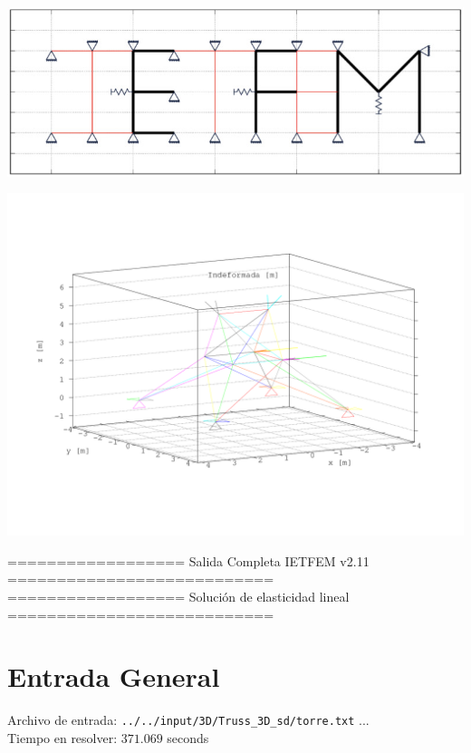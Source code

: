 \documentclass[a4paper,11pt]{article}
\begin{document}
\hspace{1.5cm}       
\begin{center}       
\includegraphics[width=.7\textwidth]{../../../../../../sources/Figs/logo_ietfem}      
\end{center}       
\begin{center}       
\includegraphics[width=.95\textwidth]{../../torre_indeformada.png}   
   \end{center}       

\newpage 

================== Salida Completa IETFEM v2.11 ===========================\\
================== Solución de elasticidad lineal ===========================
\tableofcontents     

\newpage     

\section{Entrada General} 

Archivo de entrada: \verb|../../input/3D/Truss_3D_sd/torre.txt|  ... \\

Tiempo en resolver: $371.069$ seconds \\
\end{document}
